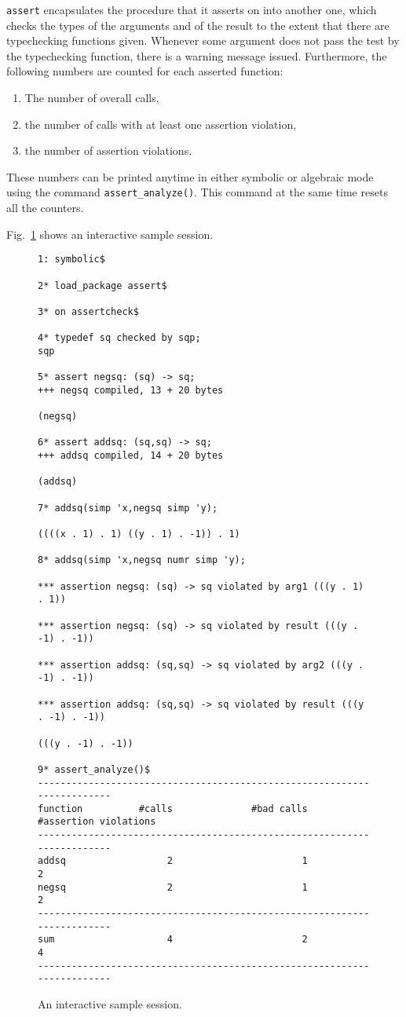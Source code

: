 \documentclass{article}
\begin{document}
\texttt{assert} encapsulates the procedure that it asserts on into
another one, which checks the types of the arguments and of the result
to the extent that there are typechecking functions given. Whenever some
argument does not pass the test by the typechecking function, there is a
warning message issued. Furthermore, the following numbers are counted
for each asserted function:
\begin{enumerate}
\item The number of overall calls,
\item the number of calls with at least one assertion violation,
\item the number of assertion violations.
\end{enumerate}
These numbers can be printed anytime in either symbolic or algebraic
mode using the command \texttt{assert\_analyze()}. This command at the
same time resets all the counters.

Fig.~\ref{FIG:sample} shows an interactive sample session.
%
\begin{figure}
  \begin{small}
\begin{verbatim}
1: symbolic$

2* load_package assert$

3* on assertcheck$

4* typedef sq checked by sqp;
sqp

5* assert negsq: (sq) -> sq;
+++ negsq compiled, 13 + 20 bytes

(negsq)

6* assert addsq: (sq,sq) -> sq;
+++ addsq compiled, 14 + 20 bytes

(addsq)

7* addsq(simp 'x,negsq simp 'y);

((((x . 1) . 1) ((y . 1) . -1)) . 1)

8* addsq(simp 'x,negsq numr simp 'y);

*** assertion negsq: (sq) -> sq violated by arg1 (((y . 1) . 1))

*** assertion negsq: (sq) -> sq violated by result (((y . -1) . -1))

*** assertion addsq: (sq,sq) -> sq violated by arg2 (((y . -1) . -1))

*** assertion addsq: (sq,sq) -> sq violated by result (((y . -1) . -1))

(((y . -1) . -1))

9* assert_analyze()$
------------------------------------------------------------------------
function          #calls              #bad calls   #assertion violations
------------------------------------------------------------------------
addsq                  2                       1                       2
negsq                  2                       1                       2
------------------------------------------------------------------------
sum                    4                       2                       4
------------------------------------------------------------------------
\end{verbatim}
  \end{small}
  \caption{An interactive sample session.\label{FIG:sample}}
\end{figure}
\end{document}
